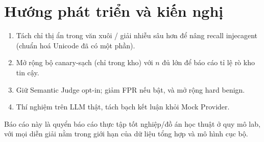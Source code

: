 \section*{Hướng phát triển và kiến nghị}

\begin{enumerate}
    \item Tách chỉ thị ẩn trong văn xuôi / giải nhiễu sâu hơn để nâng recall injecagent (chuẩn hoá Unicode đã có một phần).
    \item Mở rộng bộ canary-sạch (chỉ trong kho) với $n$ đủ lớn để báo cáo tỉ lệ rò kho tin cậy.
    \item Giữ Semantic Judge opt-in; giảm FPR nếu bật, và mở rộng hard benign.
    \item Thí nghiệm trên LLM thật, tách bạch kết luận khỏi Mock Provider.
\end{enumerate}

Báo cáo này là quyển báo cáo thực tập tốt nghiệp/đồ án học thuật ở quy mô lab, với
mọi diễn giải nằm trong giới hạn của dữ liệu tổng hợp và mô hình cục bộ.
